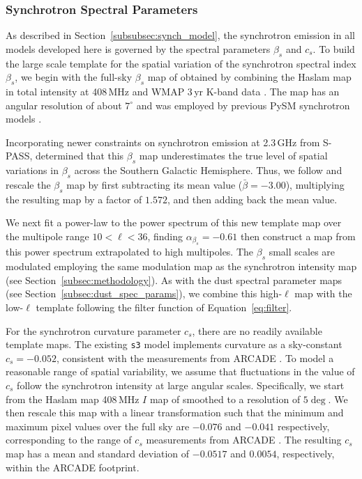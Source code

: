 \documentclass[twocolumn]{aastex631}
\begin{document}
\subsubsection{Synchrotron Spectral Parameters}\label{sec:beta_s}
As described in Section~\ref{subsubsec:synch_model}, the synchrotron emission in all models developed here is governed by the spectral parameters $\beta_s$ and $c_s$. To build the large scale template for the spatial variation of the synchrotron spectral index $\beta_s$, we begin with the full-sky $\beta_s$ map of \citet{Miville-Deschenes:2008} obtained by combining the Haslam map in total intensity at 408\,MHz \citep{Remazeilles:2015} and WMAP 3\,yr K-band data \citep{Hinshaw:2007}. The map has an angular resolution of about $7^{\circ}$ and was employed by previous PySM synchrotron models \citep{Thorne:2017}.

Incorporating newer constraints on synchrotron emission at 2.3\,GHz from S-PASS, \citet{Krachmalnicoff:2018} determined that this $\beta_s$ map underestimates the true level of spatial variations in $\beta_s$ across the Southern Galactic Hemisphere. Thus, we follow \citet{Krachmalnicoff:2018} and rescale the $\beta_s$ map by first subtracting its mean value ($\bar{\beta} = -3.00$), multiplying the resulting map by a factor of $1.572$, and then adding back the mean value.

We next fit a power-law to the power spectrum of this new template map over the multipole range $10 < \ell < 36$, finding $\alpha_{\beta_s}=-0.61$ then construct a map from this power spectrum extrapolated to high multipoles. The $\beta_s$ small scales are modulated employing the same modulation map as the synchrotron intensity map (see Section~\ref{subsec:methodology}). As with the dust spectral parameter maps (see Section~\ref{subsec:dust_spec_params}), we combine this high-$\ell$ map with the low-$\ell$ template following the filter function of Equation~\ref{eq:filter}.
 
For the synchrotron curvature parameter $c_s$, there are no readily available template maps. The existing \texttt{s3} model implements curvature as a sky-constant $c_s = -0.052$, consistent with the measurements from ARCADE \citep[$c_s=-0.052 \pm 0.005$,][]{Kogut:2012}. To model a reasonable range of spatial variability, we assume that fluctuations in the value of $c_s$ follow the synchrotron intensity at large angular scales. Specifically, we start from the Haslam map 408\,MHz $I$ map of \citet{Remazeilles:2015} smoothed to a resolution of $5 \deg$. We then rescale this map with a linear transformation such that the minimum and maximum pixel values over the full sky are $-0.076$ and $-0.041$ respectively, corresponding to the range of $c_s$ measurements from ARCADE \citep{Kogut:2012}. The resulting $c_s$ map has a mean and standard deviation of $-0.0517$ and $0.0054$, respectively, within the ARCADE footprint.
\end{document}
